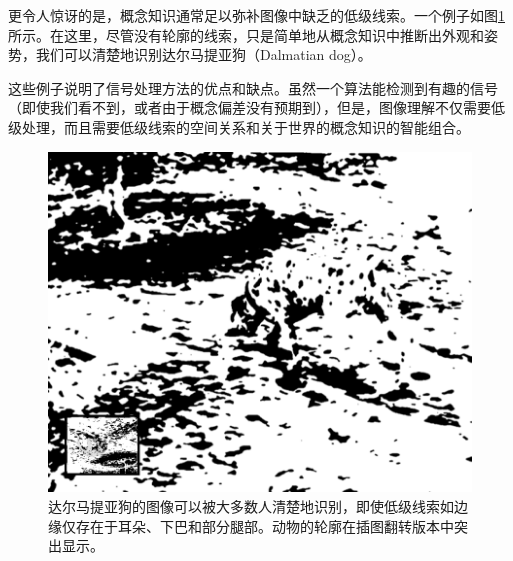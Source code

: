 
更令人惊讶的是，概念知识通常足以弥补图像中缺乏的低级线索。一个例子如图\ref{fig:dalmatian}所示。在这里，尽管没有轮廓的线索，只是简单地从概念知识中推断出外观和姿势，我们可以清楚地识别达尔马提亚狗（Dalmatian dog）。


这些例子说明了信号处理方法的优点和缺点。虽然一个算法能检测到有趣的信号（即使我们看不到，或者由于概念偏差没有预期到），但是，图像理解不仅需要低级处理，而且需要低级线索的空间关系和关于世界的概念知识的智能组合。

\begin{figure}
	\centering
		\includegraphics[width=\textwidth]{figs/dalmatian}
	\caption{达尔马提亚狗的图像可以被大多数人清楚地识别，即使低级线索如边缘仅存在于耳朵、下巴和部分腿部。动物的轮廓在插图翻转版本中突出显示。
	\label{fig:dalmatian}}
\end{figure}

